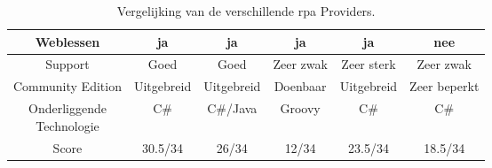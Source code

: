 \begin{sidewaystable}[h!]
\begin{tabular}{|c||c|c|c|c|c|}
		\hline
		Weblessen & ja & ja & ja & ja & nee \\
		\hline
		Support & Goed & Goed & Zeer zwak & Zeer sterk & Zeer zwak \\
		\hline
		Community Edition & Uitgebreid & Uitgebreid & Doenbaar & Uitgebreid & Zeer beperkt \\
		\hline
		\makecell{Onderliggende\\Technologie} & C\# & C\#/Java & Groovy & C\# & C\# \\
		\hline
		\hline
		Score & 30.5/34 & 26/34 & 12/34 & 23.5/34 & 18.5/34 \\
		\hline
	\end{tabular}
	\caption{Vergelijking van de verschillende \acrshort{rpa} Providers.}
	\label{Vergelijking}
\end{sidewaystable}
